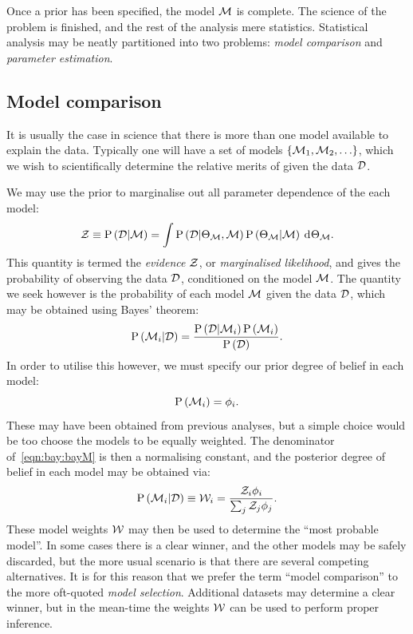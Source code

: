 Once a prior has been specified, the model \(\mathcal{M}\) is complete. The science of the problem is finished, and the rest of the analysis mere statistics. Statistical analysis may be neatly partitioned into two problems: {\em model comparison\/} and {\em parameter estimation}.

\subsection{Model comparison}
It is usually the case in science that there is more than one model available to explain the data. Typically one will have a set of models \({\{\mathcal{M}_1,\mathcal{M}_2,\ldots\}}\), which we wish to scientifically determine the relative merits of given the data \(\mathcal{D}\).

We may use the prior to marginalise out all parameter dependence of the each model:
\begin{equation}
  \mathcal{Z}\equiv\mathrm{P}\left(\mathcal{D}\middle|\mathcal{M}\right) 
  =
  \int  \mathrm{P}\left(\mathcal{D}\middle|\Theta_{\mathcal{M}},\mathcal{M}\right)\mathrm{P}\left(\Theta_{\mathcal{M}}\middle|\mathcal{M}\right)\:\operatorname{d}^{}\!{\Theta_{\mathcal{M}}}.
  \label{eqn:bay:ev_def}
\end{equation}
This quantity is termed the {\em evidence\/} \(\mathcal{Z}\), or {\em marginalised likelihood}, and gives the probability of observing the data \(\mathcal{D}\), conditioned on the model \(\mathcal{M}\). The quantity we seek however is the probability of each model \(\mathcal{M}\) given the data \(\mathcal{D}\), which may be obtained using Bayes' theorem:
\begin{equation}
  \mathrm{P}\left(\mathcal{M}_i\middle|\mathcal{D}\right) = \frac{\mathrm{P}\left(\mathcal{D}\middle|\mathcal{M}_i\right)\mathrm{P}\left(\mathcal{M}_i\right)}{\mathrm{P}\left(\mathcal{D}\right)}.
  \label{eqn:bay:bayM}
\end{equation}
In order to utilise this however, we must specify our prior degree of belief in each model:
\begin{equation}
  \mathrm{P}\left(\mathcal{M}_i\right) = \phi_i.
\end{equation}
These may have been obtained from previous analyses, but a simple choice would be too choose the models to be equally weighted. The denominator of~\eqref{eqn:bay:bayM} is then a normalising constant, and the posterior degree of belief in each model may be obtained via:
\begin{equation}
  \mathrm{P}\left(\mathcal{M}_i\middle|\mathcal{D}\right) 
  \equiv
  \mathcal{W}_i
  =
  \frac{\mathcal{Z}_i\phi_i}{\sum_j \mathcal{Z}_j\phi_j}.
\end{equation}
These model weights \(\mathcal{W}\) may then be used to determine the ``most probable model''. In some cases there is a clear winner, and the other models may be safely discarded, but the more usual scenario is that there are several competing alternatives. It is for this reason that we prefer the term ``model comparison'' to the more oft-quoted {\em model selection}. Additional datasets may determine a clear winner, but in the mean-time the weights \(\mathcal{W}\) can be used to perform proper inference. 


